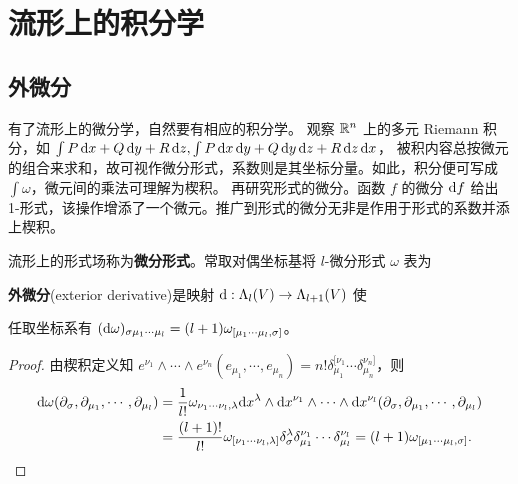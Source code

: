 \chapter{流形上的积分学}\label{appx:form}

\section{外微分}
有了流形上的微分学，自然要有相应的积分学。
观察 $\mathbb{R}^n$ 上的多元 Riemann 积分，如 $\int P\,\dd x+Q\,\dd y+R\,\dd z,\int P\,\dd x\,\dd y+Q\,\dd y\,\dd z+R\,\dd z\,\dd x$，
被积内容总按微元的组合来求和，故可视作微分形式，系数则是其坐标分量。如此，积分便可写成 $\int \omega$，微元间的乘法可理解为楔积。
再研究形式的微分。函数 $f$ 的微分 $\dd f$ 给出 1-形式，该操作增添了一个微元。推广到形式的微分无非是作用于形式的系数并添上楔积。


\begin{definition}
    流形上的形式场称为\textbf{微分形式}。常取对偶坐标基将 $l$-微分形式 $\omega$ 表为
    
\end{definition}

\begin{definition}
    \textbf{外微分}(exterior derivative)是映射 $\dd:\Lambda_l(V)\to\Lambda_{l+1}(V)$ 使
\end{definition}

\begin{theorem}
    任取坐标系有 $(\dd\omega)_{\sigma\mu_1\cdots\mu_l}=(l+1)\omega_{[\mu_1\cdots\mu_l,\sigma]}$。
\end{theorem}



\begin{proof}由楔积定义知 $e^{\nu_1}\wedge\cdots\wedge e^{\nu_n}(e_{\mu_1},\cdots,e_{\mu_n})=n!\delta_{\mu_1}^{[\nu_1}\cdots\delta_{\mu_n}^{\nu_n]}$，则
    \begin{align*}
        \dd\omega(\partial_{\sigma},\partial_{\mu_1},\cdots,\partial_{\mu_l})&=\frac{1}{l!}\omega_{\nu_1\cdots\nu_l,\lambda}\dd x^\lambda\wedge\dd x^{\nu_{1}}\wedge\cdots\wedge\dd x^{\nu_{l}}(\partial_{\sigma},\partial_{\mu_1},\cdots,\partial_{\mu_l})\\
        &=\frac{(l+1)!}{l!} \omega_{[\nu_1\cdots\nu_l,\lambda]} \delta_{\sigma}^{\lambda}\delta_{\mu_1}^{\nu_1}\cdots\delta_{\mu_l}^{\nu_l}=(l+1)\omega_{[\mu_1\cdots\mu_l,\sigma]}.\qedhere
    \end{align*}
\end{proof}

